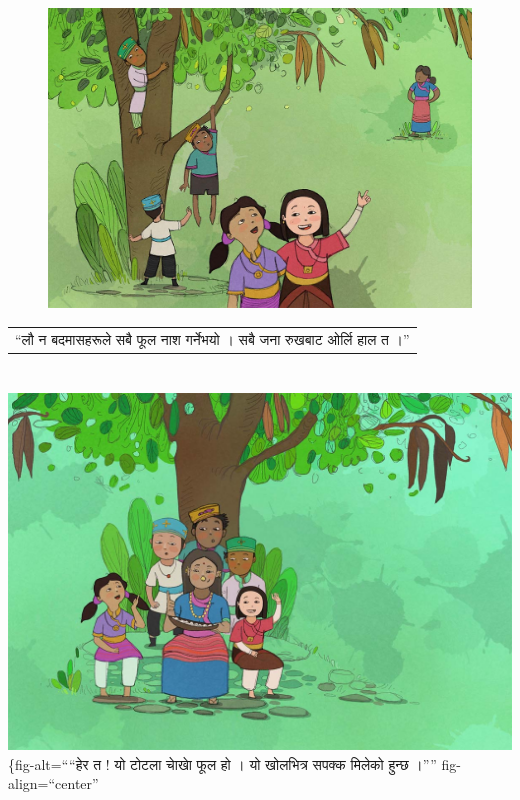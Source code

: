 \documentclass[
  letterpaper,
  DIV=11,
  numbers=noendperiod,
  paper=6in:9in,
  pagesize=pdftex,
  headinclude=on,
  footinclude=on,
  12pt]{scrreprt}
\begin{document}
\hypertarget{img}{}
\begin{figure}[H]

{\centering \includegraphics{images/p-3.jpg}

}

\end{figure}

\hypertarget{p}{}
\begin{longtable}[]{@{}l@{}}
\toprule\noalign{}
\endhead
\bottomrule\noalign{}
\endlastfoot
``लौ न बदमासहरूले सबै फूल नाश गर्नेभयो । सबै जना रुखबाट ओर्लि हाल त ।'' \\
\end{longtable}


\hypertarget{section-2}{%
\chapter{}\label{section-2}}

\leavevmode{}%
\includegraphics{images/p-4.jpg}\{fig-alt=````हेर त ! यो टोटला चाेखाे फूल हो
। यो खोलभित्र सपक्क मिलेको हुन्छ ।'''' fig-align=``center''
\end{document}

